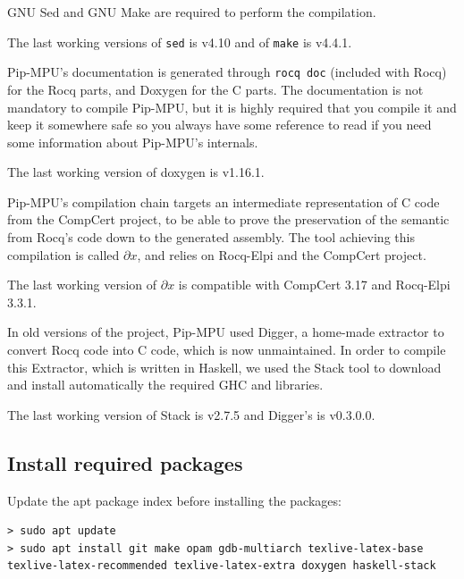 \documentclass[10pt,a4paper,titlepage]{refart}
\begin{document}
GNU Sed and GNU Make are required to perform the compilation.

The last working versions of \texttt{sed} is v4.10 and of \texttt{make} is v4.4.1.

Pip-MPU's documentation is generated through \texttt{rocq doc} (included with Rocq) for the Rocq parts, and Doxygen for the C parts.
The documentation is not mandatory to compile Pip-MPU, but it is highly required that you compile it and keep it somewhere safe so you always have some reference to read if you need some information about Pip-MPU's internals.

The last working version of doxygen is v1.16.1.

Pip-MPU's compilation chain targets an intermediate representation of C code from the CompCert project, to be able to prove the preservation of the semantic from Rocq's code down to the generated assembly.
The tool achieving this compilation is called $\partial x$, and relies on Rocq-Elpi and the CompCert project.

The last working version of $\partial x$ is compatible with CompCert 3.17 and Rocq-Elpi 3.3.1.


In old versions of the project, Pip-MPU used Digger, a home-made extractor to convert Rocq code into C code, which is now unmaintained.
In order to compile this Extractor, which is written in Haskell, we used the Stack tool to download and install automatically the required GHC and libraries.

The last working version of Stack is v2.7.5 and Digger's is v0.3.0.0.

\subsection{Install required packages}

Update the apt package index before installing the packages:

\begin{lstlisting}[style=BashStyle]
> sudo apt update
> sudo apt install git make opam gdb-multiarch texlive-latex-base texlive-latex-recommended texlive-latex-extra doxygen haskell-stack
\end{lstlisting}
\end{document}
